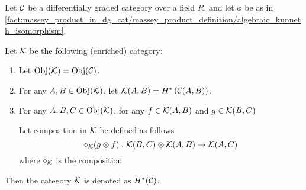 \begin{definition}
    Let \( {\mathcal{C}} \) be a differentially graded category over a field \( R \), and let \( \phi \) be as in \autoref{fact:massey_product_in_dg_cat/massey_product_definition/algebraic_kunneth_isomorphism}.

    Let \( {\mathcal{K}} \) be the following (enriched) category:
    \begin{enumerate}
        \item Let \( \operatorname{Obj}({\mathcal{K}}) = \operatorname{Obj}({\mathcal{C}}) \).
        \item For any \( A, B \in \operatorname{Obj}({\mathcal{K}}) \), let \( {\mathcal{K}}(A, B) = H^* \left( {\mathcal{C}}(A, B) \right) \).
        \item {
            For any \( A, B, C \in \operatorname{Obj}({\mathcal{K}}) \), for any \( f \in {\mathcal{K}}(A, B) \) and \( g \in {\mathcal{K}}(B, C) \)

            Let composition in \( {\mathcal{K}} \) be defined as follows
            \[
                \circ_{{\mathcal{K}}}(g \otimes f): {\mathcal{K}}(B, C) \otimes {\mathcal{K}}(A, B) \to {\mathcal{K}}(A, C)
            \]
            where \( \circ_{{\mathcal{K}}} \) is the composition
            \begin{center}
            \end{center}
        }
    \end{enumerate}

    Then the category \( {\mathcal{K}} \) is denoted as \( H^*({\mathcal{C}}) \).
\end{definition}

